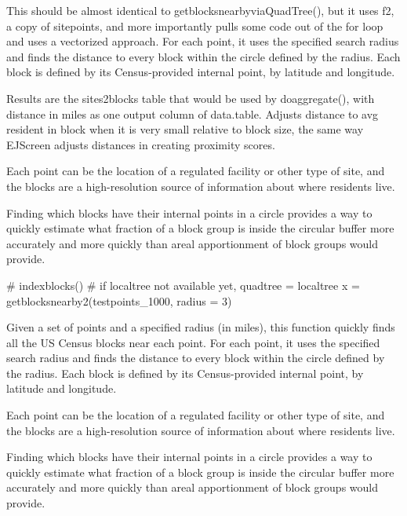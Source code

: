 \documentclass[a4paper]{book}
\begin{document}
%
\begin{Details}\relax
This should be almost identical to getblocksnearbyviaQuadTree(), but it uses f2, a copy of sitepoints, and more importantly pulls some code out of the for loop and uses a vectorized approach.
For each point, it uses the specified search radius and finds the distance to
every block within the circle defined by the radius.
Each block is defined by its Census-provided internal point, by latitude and longitude.

Results are the sites2blocks table that would be used by doaggregate(),
with distance in miles as one output column of data.table.
Adjusts distance to avg resident in block when it is very small relative to block size,
the same way EJScreen adjusts distances in creating proximity scores.

Each point can be the location of a regulated facility or other type of site, and
the blocks are a high-resolution source of information about where
residents live.

Finding which blocks have their internal points in a circle provides
a way to quickly estimate what fraction of a block group is
inside the circular buffer more accurately and more quickly than
areal apportionment of block groups would provide.
\end{Details}
%
\begin{SeeAlso}\relax
{} 
\end{SeeAlso}
%
\begin{Examples}
\begin{ExampleCode}
  # indexblocks() # if localtree not available yet, quadtree = localtree
  x = getblocksnearby2(testpoints_1000, radius = 3)
\end{ExampleCode}
\end{Examples}
%
\begin{Description}\relax
Given a set of points and a specified radius (in miles),
this function quickly finds all the US Census blocks near each point.
For each point, it uses the specified search radius and finds the distance to
every block within the circle defined by the radius.
Each block is defined by its Census-provided internal point, by latitude and longitude.

Each point can be the location of a regulated facility or other type of site, and
the blocks are a high-resolution source of information about where
residents live.

Finding which blocks have their internal points in a circle provides
a way to quickly estimate what fraction of a block group is
inside the circular buffer more accurately and more quickly than
areal apportionment of block groups would provide.
\end{Description}
\end{document}

